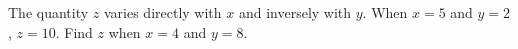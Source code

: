 The quantity $z$ varies directly with $x$ and inversely with $y$. When $x=5$ and $y=2$, $z=10$. Find $z$ when $x=4$ and $y=8$.
